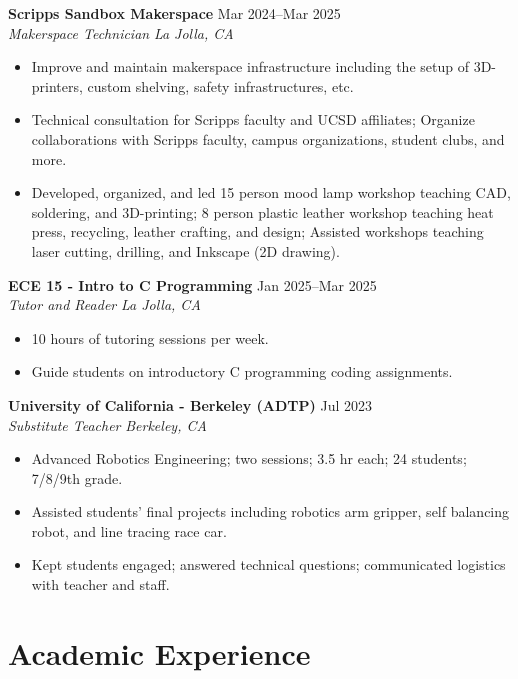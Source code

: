 \documentclass[11pt,a4paper]{article}
\newcommand{\resumeHeading}[4]{
  \vspace{0.15cm}
  \noindent\textbf{#1} \hfill #2 \\
  \noindent\textit{#3} \hfill \textit{#4} \par\vspace{0.1cm}
}
\begin{document}
\resumeHeading{Scripps Sandbox Makerspace}{Mar 2024--Mar 2025}{Makerspace Technician}{La Jolla, CA}
\begin{itemize}[leftmargin=0.2in, itemsep=2pt, parsep=0pt, topsep=2pt]
    \item Improve and maintain makerspace infrastructure including the setup of 3D-printers, custom shelving, safety infrastructures, etc.
    \item Technical consultation for Scripps faculty and UCSD affiliates; Organize collaborations with Scripps faculty, campus organizations, student clubs, and more.
    \item Developed, organized, and led 15 person mood lamp workshop teaching CAD, soldering, and 3D-printing; 8 person plastic leather workshop teaching heat press, recycling, leather crafting, and design; Assisted workshops teaching laser cutting, drilling, and Inkscape (2D drawing).
\end{itemize}

\resumeHeading{ECE 15 - Intro to C Programming}{Jan 2025--Mar 2025}{Tutor and Reader}{La Jolla, CA}
\begin{itemize}[leftmargin=0.2in, itemsep=2pt, parsep=0pt, topsep=2pt]
    \item 10 hours of tutoring sessions per week.
    \item Guide students on introductory C programming coding assignments.
\end{itemize}

\resumeHeading{University of California - Berkeley (ADTP)}{Jul 2023}{Substitute Teacher}{Berkeley, CA}
\begin{itemize}[leftmargin=0.2in, itemsep=2pt, parsep=0pt, topsep=2pt]
    \item Advanced Robotics Engineering; two sessions; 3.5 hr each; 24 students; 7/8/9th grade.
    \item Assisted students' final projects including robotics arm gripper, self balancing robot, and line tracing race car.
    \item Kept students engaged; answered technical questions; communicated logistics with teacher and staff.
\end{itemize}

\section{Academic Experience}
\end{document}
